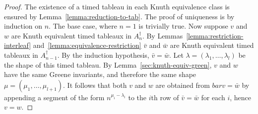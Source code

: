 \documentclass[10pt]{amsproc}
\theoremstyle{definition}
\theoremstyle{remark}
\begin{document}
\begin{proof}
  The existence of a timed tableau in each Knuth equivalence class is ensured by Lemma~\ref{lemma:reduction-to-tab}.
  The proof of uniqueness is by induction on $n$.
  The base case, where $n=1$ is trivially true.
  Now suppose $v$ and $w$ are Knuth equivalent timed tableaux in $A_n^\dagger$.
  By Lemmas~\ref{lemma:restriction-interleaf} and~\ref{lemma:equivalence-restriction} $\bar v$ and $\bar w$ are Knuth equivalent timed tableaux in $A_{n-1}^\dagger$.
  By the induction hypothesis, $\bar v=\bar w$.
  Let $\lambda=(\lambda_1,\dotsc,\lambda_l)$ be the shape of this timed tableau.
  By Lemma~\ref{sec:knuth-equiv-green}, $v$ and $w$ have the same Greene invariants, and therefore the same shape $\mu=(\mu_1,\dotsc,\mu_{l+1})$.
  It follows that both $v$ and $w$ are obtained from $bar v=\bar w$ by appending a segment of the form $n^{\mu_i-\lambda_i}$ to the $i$th row of $\bar v= \bar w$ for each $i$, hence $v=w$.
\end{proof}
\end{document}
